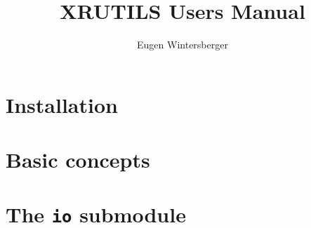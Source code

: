 \documentclass[a4paper]{book}
\title{{\Huge XRUTILS Users Manual}}
\author{Eugen Wintersberger}
\begin{document}
\maketitle
\tableofcontents
\chapter{Installation}


\chapter{Basic concepts}


\chapter{The {\tt io} submodule}

\end{document}
